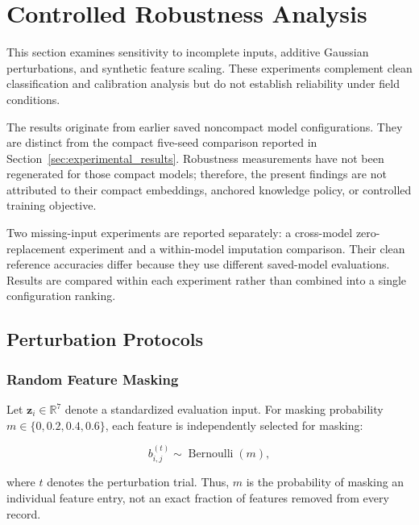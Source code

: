 \section{Controlled Robustness Analysis}
\label{sec:robustness}

This section examines sensitivity to incomplete inputs, additive
Gaussian perturbations, and synthetic feature scaling. These
experiments complement clean classification and calibration analysis
but do not establish reliability under field conditions.

The results originate from earlier saved noncompact model
configurations. They are distinct from the compact five-seed comparison
reported in Section~\ref{sec:experimental_results}. Robustness
measurements have not been regenerated for those compact models;
therefore, the present findings are not attributed to their compact
embeddings, anchored knowledge policy, or controlled training objective.

Two missing-input experiments are reported separately: a
cross-model zero-replacement experiment and a within-model imputation
comparison. Their clean reference accuracies differ because they use
different saved-model evaluations. Results are compared within each
experiment rather than combined into a single configuration ranking.

\subsection{Perturbation Protocols}

\subsubsection{Random Feature Masking}

Let $\mathbf{z}_i\in\mathbb{R}^{7}$ denote a standardized
evaluation input. For masking probability
$m\in\{0,0.2,0.4,0.6\}$, each feature is independently selected
for masking:

\begin{equation}
b_{i,j}^{(t)}
\sim
\operatorname{Bernoulli}(m),
\label{eq:robustness_mask}
\end{equation}

where $t$ denotes the perturbation trial. Thus, $m$ is the
probability of masking an individual feature entry, not an exact
fraction of features removed from every record.

